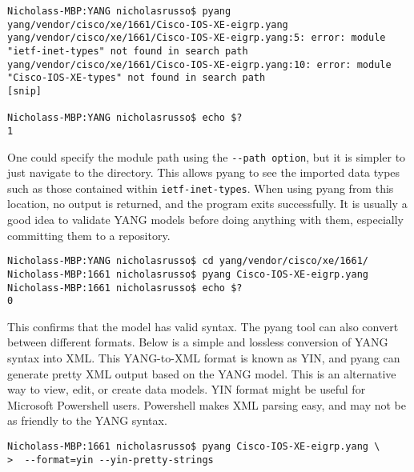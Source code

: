 \begin{verbatim}
Nicholass-MBP:YANG nicholasrusso$ pyang yang/vendor/cisco/xe/1661/Cisco-IOS-XE-eigrp.yang 
yang/vendor/cisco/xe/1661/Cisco-IOS-XE-eigrp.yang:5: error: module
"ietf-inet-types" not found in search path
yang/vendor/cisco/xe/1661/Cisco-IOS-XE-eigrp.yang:10: error: module
"Cisco-IOS-XE-types" not found in search path
[snip]

Nicholass-MBP:YANG nicholasrusso$ echo $?
1
\end{verbatim}

One could specify the module path using the \verb|--path option|, but it is
simpler to just navigate to the directory. This allows pyang to see the
imported data types such as those contained within \verb|ietf-inet-types|. When
using pyang from this location, no output is returned, and the program exits
successfully. It is usually a good idea to validate YANG models before doing
anything with them, especially committing them to a repository.

\begin{verbatim}
Nicholass-MBP:YANG nicholasrusso$ cd yang/vendor/cisco/xe/1661/
Nicholass-MBP:1661 nicholasrusso$ pyang Cisco-IOS-XE-eigrp.yang
Nicholass-MBP:1661 nicholasrusso$ echo $?
0
\end{verbatim}

This confirms that the model has valid syntax. The pyang tool can also convert
between different formats. Below is a simple and lossless conversion of YANG
syntax into XML\@. This YANG-to-XML format is known as YIN, and pyang can
generate pretty XML output based on the YANG model. This is an alternative way
to view, edit, or create data models. YIN format might be useful for Microsoft
Powershell users. Powershell makes XML parsing easy, and may not be as
friendly to the YANG syntax.

\begin{verbatim}
Nicholass-MBP:1661 nicholasrusso$ pyang Cisco-IOS-XE-eigrp.yang \
>  --format=yin --yin-pretty-strings
\end{verbatim}

